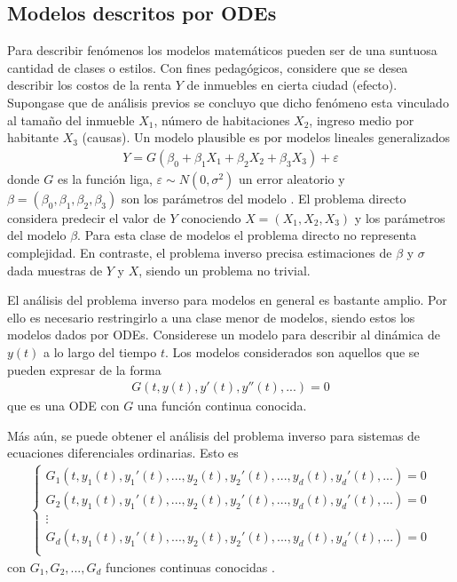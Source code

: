 \subsection{Modelos descritos por ODEs}

Para describir fenómenos los modelos matemáticos pueden ser de una suntuosa cantidad de clases o estilos. Con fines pedagógicos, considere que se desea describir los costos de la renta $Y$ de inmuebles en cierta ciudad (efecto). Supongase que de análisis previos se concluyo que dicho fenómeno esta vinculado al tamaño del inmueble $X_1$, número de habitaciones $X_2$, ingreso medio por habitante $X_3$ (causas). Un modelo plausible es por modelos lineales generalizados
\begin{align}
    Y = G(\beta_0 + \beta_1 X_1 + \beta_2 X_2 + \beta_3 X_3) + \varepsilon
    \label{2.1.1.01}
\end{align}
donde $G$ es la función liga, $\varepsilon \sim N(0,\sigma^2)$ un error aleatorio y $\beta = (\beta_0, \beta_1, \beta_2, \beta_3)$ son los parámetros del modelo \cite{dobson2018introduction}. El problema directo considera predecir el valor de $Y$ conociendo $X = (X_1,X_2,X_3)$ y los parámetros del modelo $\beta$. Para esta clase de modelos el problema directo no representa complejidad. En contraste, el problema inverso precisa estimaciones de $\beta$  y $\sigma$ dada muestras de $Y$ y $X$, siendo un problema no trivial. 

El análisis del problema inverso para modelos en general es bastante amplio. Por ello es necesario restringirlo a una clase menor de modelos, siendo estos los modelos dados por ODEs. Considerese un modelo para describir al dinámica de $y(t)$ a lo largo del tiempo $t$. Los modelos considerados son aquellos que se pueden expresar de la forma
\begin{align*}
    G(t,y(t),y'(t),y''(t),...) = 0
\end{align*}
que es una ODE con $G$ una función continua conocida.

Más aún, se puede obtener el análisis del problema inverso para sistemas de ecuaciones diferenciales ordinarias. Esto es
\begin{align*}
    \left\{
        \begin{matrix}
        G_1(t,y_1(t),y_1'(t),...,y_2(t),y_2'(t),..., y_d(t),y_d'(t),...)=0\\
        G_2(t,y_1(t),y_1'(t),...,y_2(t),y_2'(t),..., y_d(t),y_d'(t),...)=0\\
        \vdots
        \\ 
        G_d(t,y_1(t),y_1'(t),...,y_2(t),y_2'(t),..., y_d(t),y_d'(t),...)=0\\
       \end{matrix}
    \right.
\end{align*}
con $G_1, G_2, ..., G_d$ funciones continuas conocidas \cite{zill2002ecuaciones}.

